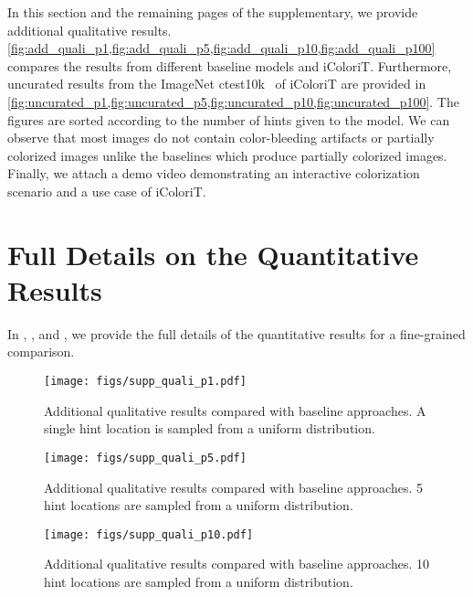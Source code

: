 \documentclass[10pt,twocolumn,letterpaper]{article}
\begin{document}
In this section and the remaining pages of the supplementary, we provide additional qualitative results. 
\cref{fig:add_quali_p1,fig:add_quali_p5,fig:add_quali_p10,fig:add_quali_p100} compares the results from different baseline models and iColoriT. Furthermore, uncurated results from the ImageNet ctest10k~\cite{ctest} of iColoriT are provided in \cref{fig:uncurated_p1,fig:uncurated_p5,fig:uncurated_p10,fig:uncurated_p100}. 
The figures are sorted according to the number of hints given to the model. 
We can observe that most images do not contain color-bleeding artifacts or partially colorized images unlike the baselines which produce partially colorized images. 
Finally, we attach a demo video demonstrating an interactive colorization scenario and a use case of iColoriT. 

\section{Full Details on the Quantitative Results}
\label{sec:sup_quanti_all}
In , , and , we provide the full details of the quantitative results for a fine-grained comparison. 







\begin{figure*}[t]
    \centering
    \texttt{[image: figs/supp\_quali\_p1.pdf]}
    \caption{Additional qualitative results compared with baseline approaches. A single hint location is sampled from a uniform distribution. }
    \label{fig:add_quali_p1}
\end{figure*}

\begin{figure*}[t]
    \centering
    \texttt{[image: figs/supp\_quali\_p5.pdf]}
    \caption{Additional qualitative results compared with baseline approaches. 5 hint locations are sampled from a uniform distribution. }
    \label{fig:add_quali_p5}
\end{figure*}

\begin{figure*}[t]
    \centering
    \texttt{[image: figs/supp\_quali\_p10.pdf]}
    \caption{Additional qualitative results compared with baseline approaches. 10 hint locations are sampled from a uniform distribution. }
    \label{fig:add_quali_p10}
\end{figure*}
\end{document}
